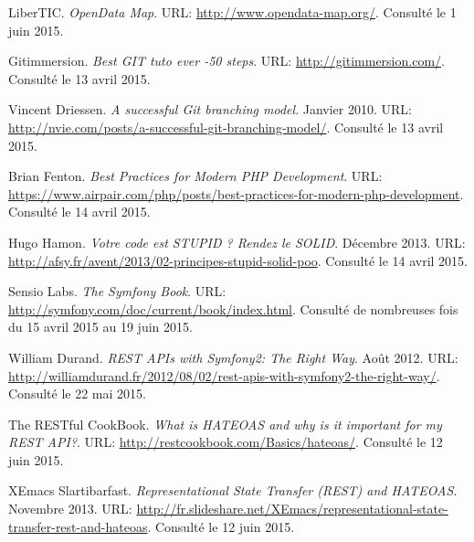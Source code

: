 
\renewcommand{\refname}{Webographie}

\begin{thebibliography}{ABC}

     LiberTIC. \emph{OpenData Map}. URL: \url{http://www.opendata-map.org/}. Consulté le 1 juin 2015.

     Gitimmersion. \emph{Best GIT tuto ever -50 steps}. URL: \url{http://gitimmersion.com/}. Consulté le 13 avril 2015.

     Vincent Driessen. \emph{A successful Git branching model}. Janvier 2010. URL: \url{http://nvie.com/posts/a-successful-git-branching-model/}. Consulté le 13 avril 2015.

     Brian Fenton. \emph{Best Practices for Modern PHP Development}. URL: \url{https://www.airpair.com/php/posts/best-practices-for-modern-php-development}. Consulté le 14 avril 2015.

     Hugo Hamon. \emph{Votre code est STUPID ? Rendez le SOLID}. Décembre 2013. URL: \url{http://afsy.fr/avent/2013/02-principes-stupid-solid-poo}. Consulté le 14 avril 2015.

     Sensio Labs. \emph{The Symfony Book}. URL: \url{http://symfony.com/doc/current/book/index.html}. Consulté de nombreuses fois du 15 avril 2015 au 19 juin 2015.

     William Durand. \emph{REST APIs with Symfony2: The Right Way}. Août 2012. URL: \url{http://williamdurand.fr/2012/08/02/rest-apis-with-symfony2-the-right-way/}. Consulté le 22 mai 2015.

     The RESTful CookBook. \emph{What is HATEOAS and why is it important for my REST API?}. URL: \url{http://restcookbook.com/Basics/hateoas/}. Consulté le 12 juin 2015.

     XEmacs Slartibarfast. \emph{Representational State Transfer (REST) and HATEOAS}. Novembre 2013. URL: \url{http://fr.slideshare.net/XEmacs/representational-state-transfer-rest-and-hateoas}. Consulté le 12 juin 2015.

    \setcounter{firstbib}{\value{enumiv}}
\end{thebibliography}

\renewcommand{\refname}{RFCs}

